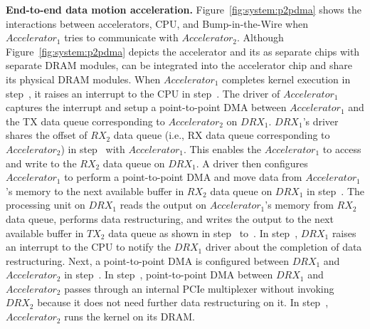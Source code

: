 \noindent \textbf{End-to-end data motion acceleration.}
Figure~\ref{fig:system:p2pdma} shows the interactions between accelerators, CPU, and Bump-in-the-Wire \drx when $Accelerator_{1}$ tries to communicate with $Accelerator_{2}$. Although Figure~\ref{fig:system:p2pdma} depicts the accelerator and its \drx as separate chips with separate DRAM modules, \drx can be integrated into the accelerator chip and share its physical DRAM modules. %
%
%
%
%
When $Accelerator_{1}$ completes kernel execution in step~, it raises an interrupt to the CPU in step~. The driver of $Accelerator_{1}$ captures the interrupt and setup a point-to-point DMA between $Accelerator_{1}$ and the TX data queue corresponding to $Accelerator_{2}$ on $DRX_{1}$.
%
$DRX_{1}$'s driver shares the offset of $RX_{2}$ data queue (i.e., RX data queue corresponding to $Accelerator_{2}$) in step~ with $Accelerator_{1}$.
%
This enables the $Accelerator_{1}$ to access and write to the $RX_{2}$ data queue on $DRX_{1}$.
%
A \drx driver then configures $Accelerator_{1}$ to perform a point-to-point DMA and move data from $Accelerator_{1}$'s memory to the next available buffer in $RX_{2}$ data queue on $DRX_{1}$ in step~.
%
%
The \drx processing unit on $DRX_{1}$ reads the output on $Accelerator_{1}$'s memory from $RX_{2}$ data queue, performs data restructuring, and writes the output to the next available buffer in $TX_{2}$ data queue as shown in step~ to~.
%
In step~, $DRX_{1}$ raises an interrupt to the CPU to notify the $DRX_{1}$ driver about the completion of data restructuring.
%
Next, a point-to-point DMA is configured between $DRX_{1}$ and $Accelerator_{2}$ in step~.  
%
In step~, point-to-point DMA between $DRX_{1}$ and $Accelerator_{2}$ passes through an internal PCIe multiplexer
without invoking $DRX_{2}$ because it does not need further data restructuring on it.
%
In step~, $Accelerator_{2}$ runs the kernel on its DRAM. 

